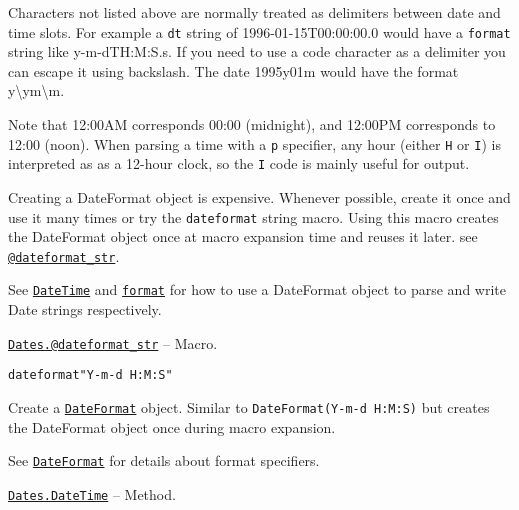 \begin{adjustwidth}{2em}{0pt}
\begin{table}[h]
\end{table}

Characters not listed above are normally treated as delimiters between date and time slots. For example a \texttt{dt} string of {\textquotedbl}1996-01-15T00:00:00.0{\textquotedbl} would have a \texttt{format} string like {\textquotedbl}y-m-dTH:M:S.s{\textquotedbl}. If you need to use a code character as a delimiter you can escape it using backslash. The date {\textquotedbl}1995y01m{\textquotedbl} would have the format {\textquotedbl}y{\textbackslash}ym{\textbackslash}m{\textquotedbl}.

Note that 12:00AM corresponds 00:00 (midnight), and 12:00PM corresponds to 12:00 (noon). When parsing a time with a \texttt{p} specifier, any hour (either \texttt{H} or \texttt{I}) is interpreted as as a 12-hour clock, so the \texttt{I} code is mainly useful for output.

Creating a DateFormat object is expensive. Whenever possible, create it once and use it many times or try the \texttt{dateformat{\textquotedbl}{\textquotedbl}} string macro. Using this macro creates the DateFormat object once at macro expansion time and reuses it later. see \hyperlink{10511139750795822255}{\texttt{@dateformat\_str}}.

See \hyperlink{17572689933274889838}{\texttt{DateTime}} and \hyperlink{16940765638871841169}{\texttt{format}} for how to use a DateFormat object to parse and write Date strings respectively.



\end{adjustwidth}
\hypertarget{10511139750795822255}{} 
\hyperlink{10511139750795822255}{\texttt{Dates.@dateformat\_str}}  -- {Macro.}

\begin{adjustwidth}{2em}{0pt}


\begin{verbatim}
dateformat"Y-m-d H:M:S"
\end{verbatim}

Create a \hyperlink{18093459443158853001}{\texttt{DateFormat}} object. Similar to \texttt{DateFormat({\textquotedbl}Y-m-d H:M:S{\textquotedbl})} but creates the DateFormat object once during macro expansion.

See \hyperlink{18093459443158853001}{\texttt{DateFormat}} for details about format specifiers.



\end{adjustwidth}
\hypertarget{3209456936474118206}{} 
\hyperlink{3209456936474118206}{\texttt{Dates.DateTime}}  -- {Method.}

